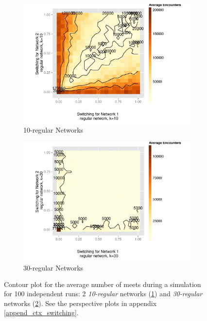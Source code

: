 \documentclass[preprint,number]{elsarticle}
\begin{document}
\begin{figure}[H]
	\centering
	\begin{subfigure}{0.49\linewidth}
		\centering
		\includegraphics[width=1\linewidth]{"../analysis/pdf/context_switching_2_10_regular_switching_contour"}
		\caption{10-regular Networks}
		\label{fig:ctx_cs_2_10kreg}
	\end{subfigure}%
	\begin{subfigure}{0.49\linewidth}
		\centering
		\includegraphics[width=1\linewidth]{"../analysis/pdf/context_switching_2_30_regular_switching_contour"}
		\caption{30-regular Networks}
		\label{fig:ctx_cs_2_30kreg}
	\end{subfigure}
	
	\begin{minipage}{0.9\linewidth}
		\vspace{0.2cm}
		\caption{Contour plot for the average number of meets during a simulation for 100 independent runs: 2 \textit{10-regular} networks (\ref{fig:ctx_cs_2_10kreg}) and \textit{30-regular} networks (\ref{fig:ctx_cs_2_30kreg}). See the perspective plots in appendix \ref{append_ctx_switching}.}
		\label{fig:ctx_cs_2_kregular}
	\end{minipage}
\end{figure}
\end{document}
